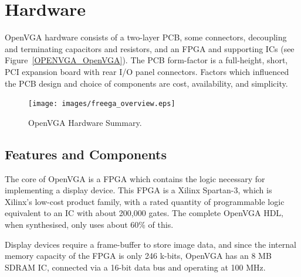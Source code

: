 \chapter{Hardware}


OpenVGA hardware consists of a two-layer PCB, some connectors, decoupling and
terminating capacitors and resistors, and an FPGA and supporting ICs (see
Figure~\ref{OPENVGA_OpenVGA}). The PCB form-factor is a full-height, short,
PCI expansion board with rear I/O panel connectors. Factors which influenced the
PCB design and choice of components are cost, availability, and simplicity.

\begin{figure}[h!]
\begin{center}
\texttt{[image: images/freega\_overview.eps]}
\caption[OpenVGA Hardware Summary]{OpenVGA Hardware Summary.}
\label{HARD_OpenVGA}
\end{center}
\end{figure}



\section{Features and Components}
The core of OpenVGA is a FPGA which contains the logic necessary for implementing
a display device. This FPGA is a Xilinx Spartan-3, which is Xilinx's low-cost
product family, with a rated quantity of programmable logic equivalent to an IC
with about 200,000 gates. The complete OpenVGA HDL, when synthesised, only uses
about 60\% of this.

Display devices require a frame-buffer to store image data, and since the
internal memory capacity of the FPGA is only 246 k-bits, OpenVGA has an 8 MB SDRAM
IC, connected via a 16-bit data bus and operating at 100 MHz.


